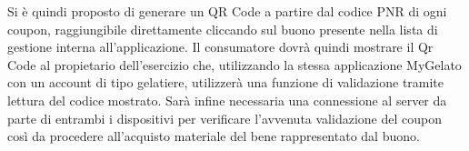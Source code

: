 Si è quindi proposto di generare un QR Code a partire dal codice PNR di ogni coupon, raggiungibile direttamente cliccando sul buono presente nella lista di gestione interna all'applicazione.
Il consumatore dovrà quindi mostrare il Qr Code al propietario dell'esercizio che, utilizzando la stessa applicazione MyGelato con un account di tipo gelatiere, utilizzerà una funzione di validazione tramite lettura del codice mostrato.
Sarà infine necessaria una connessione al server da parte di entrambi i dispositivi per verificare l'avvenuta validazione del coupon così da procedere all'acquisto materiale del bene rappresentato dal buono.































\newpage